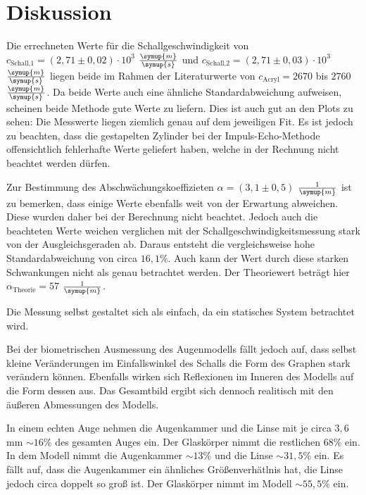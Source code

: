 \section{Diskussion}
\label{sec:Diskussion}


Die errechneten Werte für die Schallgeschwindigkeit von $c_\text{Schall,1} = (2,71 \pm 0,02) \cdot 10^{3}$ $\frac{\symup{m}}{\symup{s}}$ und $c_\text{Schall,2} = (2,71 \pm 0,03) \cdot 10^{3}$ $\frac{\symup{m}}{\symup{s}}$
liegen beide im Rahmen der Literaturwerte von $c_\text{Acryl} = 2670$ bis $2760$ $\frac{\symup{m}}{\symup{s}}$\cite{acryl}.
Da beide Werte auch eine ähnliche Standardabweichung aufweisen, scheinen beide Methode gute Werte zu liefern. Dies ist auch gut an den Plots zu sehen:
Die Messwerte liegen ziemlich genau auf dem jeweiligen Fit.
Es ist jedoch zu beachten, dass die gestapelten Zylinder bei der Impuls-Echo-Methode offensichtlich fehlerhafte Werte geliefert haben, welche in der Rechnung nicht beachtet werden dürfen.

Zur Bestimmung des Abschwächungskoeffizieten $\alpha = (3,1 \pm 0,5)$ $\frac{1}{\symup{m}}$ ist zu bemerken, dass einige Werte ebenfalls weit von der Erwartung abweichen. Diese wurden daher bei der Berechnung nicht beachtet.
Jedoch auch die beachteten Werte weichen verglichen mit der Schallgeschwindigkeitsmessung stark von der Ausgleichsgeraden ab.
Daraus entsteht die vergleichsweise hohe Standardabweichung von circa $16,1 \%$. Auch kann der Wert durch diese starken Schwankungen nicht als genau betrachtet werden.
Der Theoriewert beträgt hier $\alpha_\text{Theorie} = 57$ $\frac{1}{\symup{m}}$.

Die Messung selbst gestaltet sich als einfach, da ein statisches System betrachtet wird.

Bei der biometrischen Ausmessung des Augenmodells fällt jedoch auf, dass selbst kleine Veränderungen im Einfallswinkel des Schalls die Form des Graphen stark verändern können.
Ebenfalls wirken sich Reflexionen im Inneren des Modells auf die Form dessen aus. Das Gesamtbild ergibt sich dennoch realitisch mit den äußeren Abmessungen des Modells.

In einem echten Auge nehmen die Augenkammer und die Linse mit je circa $3,6$ mm $\sim \! 16\%$ des gesamten Auges ein.
Der Glaskörper nimmt die restlichen $68 \%$ ein. In dem Modell nimmt die Augenkammer $\sim \! 13\%$ und die Linse $\sim \! 31,5 \%$ ein.
Es fällt auf, dass die Augenkammer ein ähnliches Größenverhätlnis hat, die Linse jedoch circa doppelt so groß ist.
Der Glaskörper nimmt im Modell $\sim \! 55,5 \%$ ein.

